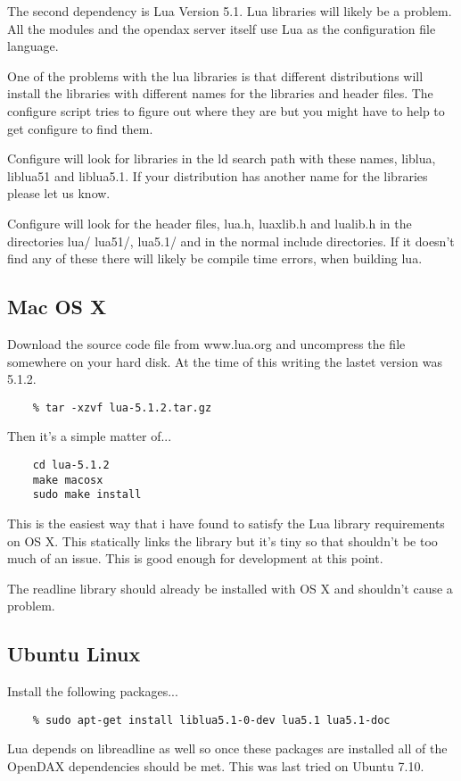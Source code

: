 \documentclass[10pt,letterpaper]{report}
\begin{document}
The second dependency is Lua Version 5.1. Lua libraries will likely be a problem. All the modules and the opendax server itself use Lua as the configuration file language.

One of the problems with the lua libraries is that different distributions will install the libraries with different names for the libraries and header files. The configure script tries to figure out where they are but you might have to help to get configure to find them.

Configure will look for libraries in the ld search path with these names, liblua, liblua51 and liblua5.1. If your distribution has another name for the libraries please let us know.

Configure will look for the header files, lua.h, luaxlib.h and lualib.h in the directories lua/ lua51/, lua5.1/ and in the normal include directories. If it doesn't find any of these there will likely be compile time errors, when building lua.

\subsection{Mac OS X}
Download the source code file from www.lua.org and uncompress the file somewhere on your hard disk. At the time of this writing the lastet version was 5.1.2.
\begin{verbatim}
    % tar -xzvf lua-5.1.2.tar.gz
\end{verbatim}

Then it's a simple matter of...
\begin{verbatim}
    cd lua-5.1.2
    make macosx
    sudo make install
\end{verbatim}

This is the easiest way that i have found to satisfy the Lua library requirements on OS X. This statically links the library but it's tiny so that shouldn't be too much of an issue. This is good enough for development at this point.

The readline library should already be installed with OS X and shouldn't cause a problem.
\subsection{Ubuntu Linux}

Install the following packages...
\begin{verbatim}
    % sudo apt-get install liblua5.1-0-dev lua5.1 lua5.1-doc
\end{verbatim}
Lua depends on libreadline as well so once these packages are installed all of the OpenDAX dependencies should be met. This was last tried on Ubuntu 7.10.
\end{document}
